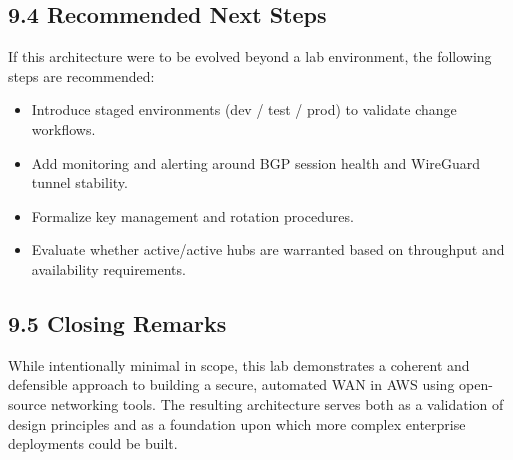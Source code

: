 \documentclass[11pt]{article}
\begin{document}
\subsection{9.4 Recommended Next Steps}
\label{sec:conclusion-next-steps-actions}

If this architecture were to be evolved beyond a lab environment, the following steps are recommended:

\begin{itemize}
  \item Introduce staged environments (dev / test / prod) to validate change workflows.
  \item Add monitoring and alerting around BGP session health and WireGuard tunnel stability.
  \item Formalize key management and rotation procedures.
  \item Evaluate whether active/active hubs are warranted based on throughput and availability requirements.
\end{itemize}

\subsection{9.5 Closing Remarks}
\label{sec:conclusion-closing}

While intentionally minimal in scope, this lab demonstrates a coherent and defensible approach to building a secure, automated WAN in AWS using open-source networking tools. The resulting architecture serves both as a validation of design principles and as a foundation upon which more complex enterprise deployments could be built.


%
%
%
%
\appendix
\end{document}
